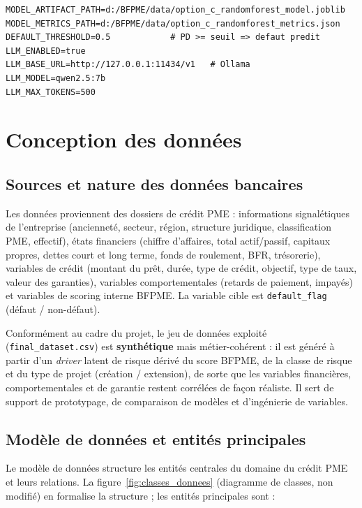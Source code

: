 \begin{lstlisting}[caption={Extrait de configuration (.env)}, label={lst:env}]
MODEL_ARTIFACT_PATH=d:/BFPME/data/option_c_randomforest_model.joblib
MODEL_METRICS_PATH=d:/BFPME/data/option_c_randomforest_metrics.json
DEFAULT_THRESHOLD=0.5            # PD >= seuil => defaut predit
LLM_ENABLED=true
LLM_BASE_URL=http://127.0.0.1:11434/v1   # Ollama
LLM_MODEL=qwen2.5:7b
LLM_MAX_TOKENS=500
\end{lstlisting}

\section{Conception des données}

\subsection{Sources et nature des données bancaires}

Les données proviennent des dossiers de crédit PME : informations signalétiques de
l'entreprise (ancienneté, secteur, région, structure juridique, classification PME,
effectif), états financiers (chiffre d'affaires, total actif/passif, capitaux
propres, dettes court et long terme, fonds de roulement, BFR, trésorerie), variables
de crédit (montant du prêt, durée, type de crédit, objectif, type de taux, valeur des
garanties), variables comportementales (retards de paiement, impayés) et variables
de scoring interne BFPME. La variable cible est \texttt{default\_flag} (défaut /
non-défaut).

Conformément au cadre du projet, le jeu de données exploité
(\texttt{final\_dataset.csv}) est \textbf{synthétique} mais métier-cohérent : il est
généré à partir d'un \textit{driver} latent de risque dérivé du score BFPME, de la
classe de risque et du type de projet (création / extension), de sorte que les
variables financières, comportementales et de garantie restent corrélées de façon
réaliste. Il sert de support de prototypage, de comparaison de modèles et
d'ingénierie de variables.

\subsection{Modèle de données et entités principales}

Le modèle de données structure les entités centrales du domaine du crédit PME et
leurs relations. La figure~\ref{fig:classes_donnees} (diagramme de classes, non
modifié) en formalise la structure ; les entités principales sont :

